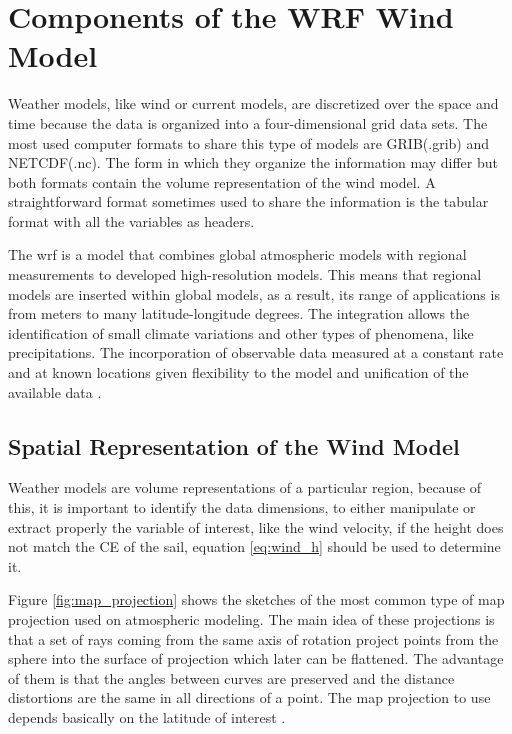 \section{Components of the WRF Wind Model} \label{sec:WRF_WindM}
Weather models, like wind or current models, are discretized over the space and time because the data is organized into a four-dimensional grid data sets. The most used computer formats to share this type of models are GRIB(.grib) and NETCDF(.nc). The form in which they organize the information may differ but both formats contain the volume representation of the wind model. A straightforward format sometimes used to share the information is the tabular format with all the variables as headers. \par

The \acrshort{wrf} is a model that combines global atmospheric models with regional measurements to developed high-resolution models. This means that regional models are inserted within global models, as a result, its range of applications is from meters to many latitude-longitude degrees. The integration allows the identification of small climate variations and other types of phenomena, like precipitations. The incorporation of observable data measured at a constant rate and at known locations given flexibility to the model and unification of the available data \cite{warner2010numerical}. \par

\subsection{Spatial Representation of the Wind Model} \label{sec:Space_WindM}

Weather models are volume representations of a particular region, because of this, it is important to identify the data dimensions, to either manipulate or extract properly the variable of interest, like the wind velocity, if the height does not match the CE of the sail, equation \ref{eq:wind_h} should be used to determine it. \par \noindent

Figure \ref{fig:map_projection} shows the sketches of the most common type of map projection used on atmospheric modeling. The main idea of these projections is that a set of rays coming from the same axis of rotation project points from the sphere into the surface of projection which later can be flattened. The advantage of them is that the angles between curves are preserved and the distance distortions are the same in all directions of a point. The map projection to use depends basically on the latitude of interest \cite{warner2010numerical}. \par

